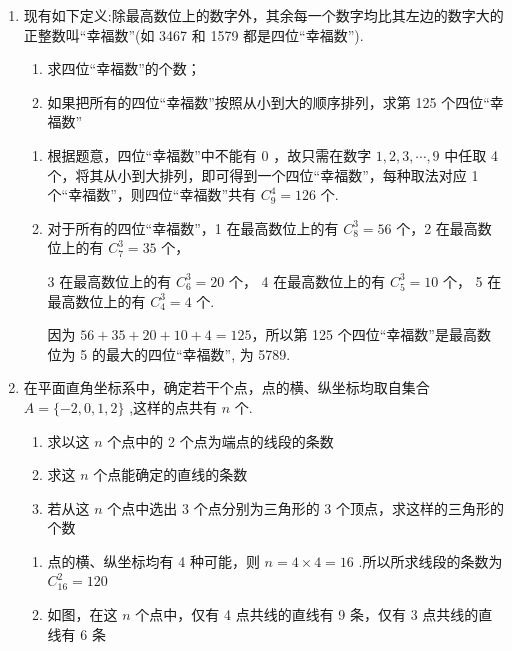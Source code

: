 \begin{enumerate}
\begin{enumerate}
\begin{jieda}
            由分类计数原理,可得共有 $1 + 6 + 3 + 9 + 1 = {20}$ 种不同的“ $F$ 数”.
        \end{jieda}
        \item 现有如下定义:除最高数位上的数字外，其余每一个数字均比其左边的数字大的正整数叫“幸福数”(如 3467 和 1579 都是四位“幸福数”).
        \begin{enumerate}
            \item 求四位“幸福数”的个数；
            \item 如果把所有的四位“幸福数”按照从小到大的顺序排列，求第 125 个四位“幸福数”
        \end{enumerate}
        \begin{jieda}
            \begin{enumerate}
                \item 根据题意，四位“幸福数”中不能有 0 ，故只需在数字 $1, 2, 3, \cdots , 9$ 中任取 4 个，将其从小到大排列，即可得到一个四位“幸福数”，每种取法对应 1 个“幸福数”，则四位“幸福数”共有 ${{C}}_{9}^{4} = {126}$ 个.
                
                \item 对于所有的四位“幸福数”，1 在最高数位上的有 ${{C}}_{8}^{3} = {56}$ 个，2 在最高数位上的有 ${{C}}_{7}^{3} = {35}$ 个，

                3 在最高数位上的有 ${{C}}_{6}^{3} = {20}$ 个， 4 在最高数位上的有 ${{C}}_{5}^{3} = {10}$ 个， 5 在最高数位上的有 ${{C}}_{4}^{3} = 4$ 个.
                
                因为 ${56} + {35} + {20} + {10} + 4 = {125}$，所以第 125 个四位“幸福数”是最高数位为 5 的最大的四位“幸福数”, 为 5789.
            \end{enumerate}
        \end{jieda}
        \item 在平面直角坐标系中，确定若干个点，点的横、纵坐标均取自集合 $A =  \{  - 2,0,1,2\}$ ,这样的点共有 $n$ 个.
        \begin{enumerate}
            \item 求以这 $n$ 个点中的 2 个点为端点的线段的条数
            \item 求这 $n$ 个点能确定的直线的条数
            \item 若从这 $n$ 个点中选出 3 个点分别为三角形的 3 个顶点，求这样的三角形的个数
        \end{enumerate}
        \begin{jieda}
            \begin{enumerate}
                \item 点的横、纵坐标均有 4 种可能，则 $n = 4 \times  4 = {16}$ .所以所求线段的条数为 ${{C}}_{16}^{2} = {120}$
                \item 如图，在这 $n$ 个点中，仅有 4 点共线的直线有 9 条，仅有 3 点共线的直线有 6 条
                

\end{enumerate}
\end{jieda}
\end{enumerate}
\end{enumerate}
